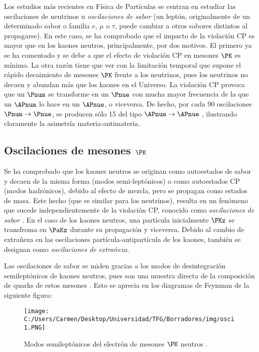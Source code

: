 Los estudios más recientes en Física de Partículas se centran en estudiar las oscilaciones de neutrinos u \textit{oscilaciones de sabor} (un leptón, originalmente de un determinado sabor o familia $e$, $\mu$ o $\tau$, puede cambiar a otros sabores distintos al propagarse). En este caso, se ha comprobado que el impacto de la violación CP es mayor que en los kaones neutros, principalmente, por dos motivos. El primero ya se ha comentado y se debe a que el efecto de violación CP en mesones $\PK$ es mínimo. La otra razón tiene que ver con la limitación temporal que supone el rápido decaimiento de mesones $\PK$ frente a los neutrinos, pues los neutrinos no decaen y abundan más que los kaones en el Universo. La violación CP provoca que un $\Pnum$ se transforme en un $\Pnue$ con mucha mayor frecuencia de la que un $\APnum$ lo hace en un $\APnue$, o viceversa. De hecho, por cada 90 oscilaciones $\Pnum\rightarrow\Pnue$, se producen sólo 15 del tipo $\APnum\rightarrow\APnue$ \cite{T2K}, ilustrando claramente la asimetría materia-antimateria.
\vspace{3mm}

\subsection{Oscilaciones de mesones $\PK$}\label{sec:kaon_oscillations}
Se ha comprobado que los kaones neutros se originan como autoestados de sabor y decaen de la misma forma (modos semi-leptónicos) o como autoestados CP (modos hadrónicos), debido al efecto de mezcla, pero se propagan como estados de masa. Este hecho (que es similar para los neutrinos), resulta en un fenómeno que sucede independientemente de la violación CP, conocido como \textit{oscilaciones de sabor} \cite{Thomson}. En el caso de los kaones neutros, una partícula inicialmente $\PKz$ se transfroma en $\PaKz$ durante su propagación y viceversa. Debido al cambio de extrañeza en las oscilaciones partícula-antipartícula de los kaones, también se designan como \textit{oscilaciones de extrañeza}.

Las oscilaciones de sabor se miden gracias a los modos de desintegración semileptónicos de kaones neutros, pues son una muestra directa de la composición de quarks de estos mesones \cite{Thomson}. Esto se aprecia en los diagramas de Feynman de la siguiente figura:
\begin{figure}[!ht]
	\centering
	\texttt{[image: C:/Users/Carmen/Desktop/Universidad/TFG/Borradores/img/osci1.PNG]}
	\caption[Modos semileptónicos del electrón de mesones $\PK$ neutros]
	{Modos semileptónicos del electrón de mesones $\PK$ neutros \cite{Thomson}.}
	\label{fig:oscillation1}
\end{figure}

